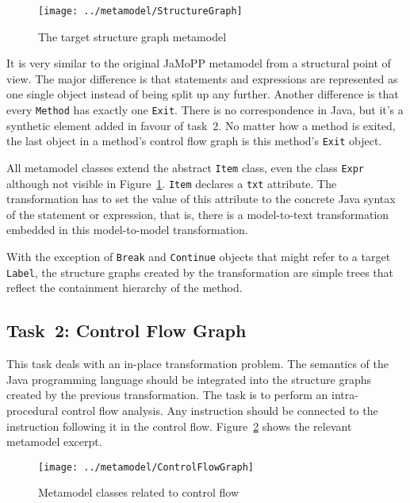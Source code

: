 \documentclass[submission]{eptcs}
\begin{document}
\begin{figure}[h!]
  \centering
  \texttt{[image: ../metamodel/StructureGraph]}
  \caption{The target structure graph metamodel}
  \label{fig:structure-graph-mm}
\end{figure}

It is very similar to the original JaMoPP metamodel from a structural point of
view.  The major difference is that statements and expressions are represented
as one single object instead of being split up any further.  Another difference
is that every \verb|Method| has exactly one \verb|Exit|.  There is no
correspondence in Java, but it's a synthetic element added in favour of task~2.
No matter how a method is exited, the last object in a method's control flow
graph is this method's \verb|Exit| object.

All metamodel classes extend the abstract \verb|Item| class, even the class
\verb|Expr| although not visible in Figure~\ref{fig:structure-graph-mm}.
\verb|Item| declares a \verb|txt| attribute.  The transformation has to set the
value of this attribute to the concrete Java syntax of the statement or
expression, that is, there is a model-to-text transformation embedded in this
model-to-model transformation.

With the exception of \verb|Break| and \verb|Continue| objects that might refer
to a target \verb|Label|, the structure graphs created by the transformation
are simple trees that reflect the containment hierarchy of the method.

\subsection{Task~2: Control Flow Graph}
\label{sec:task2-cf-graph}

This task deals with an in-place transformation problem.  The semantics of the
Java programming language should be integrated into the structure graphs
created by the previous transformation.  The task is to perform an
intra-procedural control flow analysis.  Any instruction should be connected to
the instruction following it in the control flow.
Figure~\ref{fig:control-flow-mm} shows the relevant metamodel excerpt.

\begin{figure}[h!]
  \centering
  \texttt{[image: ../metamodel/ControlFlowGraph]}
  \caption{Metamodel classes related to control flow}
  \label{fig:control-flow-mm}
\end{figure}
\end{document}
